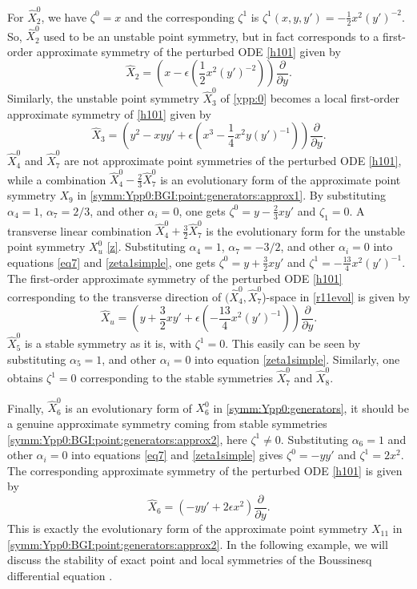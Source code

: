 \documentclass[11pt,letter,subeqn]{article}
\begin{document}
  For $\hat{X}^{0}_2$, we have $\zeta^0=x$ and the corresponding $\zeta^1$
  is $\zeta^1(x,y,y')=-\frac{1}{2}x^2(y')^{-2}$. So, $\hat{X}^{0}_2$ used to be an {\textrm{unstable}} point symmetry, but in fact corresponds to a first-order approximate symmetry of the
  perturbed ODE \eqref{h101} given by
  \[
    \hat{X}_2=\left(x-\epsilon\left(\dfrac{1}{2}x^2(y')^{-2}\right)\right)\dfrac{\partial}{\partial y}.
      \]
      Similarly, the {\textrm{unstable}} point symmetry $\hat{X}^{0}_3$ of \eqref{ypp:0} becomes a local first-order approximate symmetry of \eqref{h101} given by
     \[
    \hat{X}_3=\left(y^2-xyy'+\epsilon\left(x^3-\dfrac{1}{4}x^2y(y')^{-1}\right)\right)\dfrac{\partial}{\partial y}.
      \]
   $\hat{X}^{0}_4$ and $\hat{X}^{0}_7$ are not approximate point symmetries of the perturbed ODE \eqref{h101}, while a combination $\hat{X}^{0}_4-\frac{2}{3}\hat{X}^{0}_7$ is an
   {\textrm{evolutionary form}} of the approximate point symmetry $X_9$ in \eqref{symm:Ypp0:BGI:point:generators:approx1}. By
   substituting $\alpha_4=1$, $\alpha_7=2/3$, and other $\alpha_i=0$, one gets $\zeta^0=y-\frac{2}{3} xy'$ and $\zeta_1=0$. A transverse linear combination
   $\hat{X}^{0}_4+\frac{3}{2}\hat{X}^{0}_7$ is the {\textrm{evolutionary form}} for the {\textrm{unstable}} point symmetry $X^0_u$ \eqref{z}. Substituting $\alpha_4=1$,
   $\alpha_7=-3/2$, and other $\alpha_i=0$ into equations \eqref{eq7} and \eqref{zeta1simple}, one gets $\zeta^0=y+\frac{3}{2} xy'$ and $\zeta^1=-\frac{13}{4}x^2(y')^{-1}$. The
   first-order approximate symmetry of the perturbed ODE \eqref{h101} corresponding to the transverse direction of $(\hat{X}^{0}_4,\hat{X}^{0}_7$)-space in \eqref{r11evol} is given by
   \[
     \hat{X}_u=\left(y+\dfrac{3}{2} xy'+\epsilon\left(-\dfrac{13}{4}x^2(y')^{-1}\right)\right)\dfrac{\partial}{\partial y}.
   \]
   $\hat{X}^{0}_5$ is a {\textrm{stable}} symmetry as it is, with $\zeta^1=0$. This easily can be seen by substituting $\alpha_5=1$, and other $\alpha_i=0$ into equation \eqref{zeta1simple}. Similarly, one obtains  $\zeta^1=0$
   corresponding to the {\textrm{stable}} symmetries $\hat{X}^{0}_7$ and $\hat{X}^{0}_8$.

   Finally, $\hat{X}^{0}_6$ is an {\textrm{evolutionary form}} of $X^0_6$ in \eqref{symm:Ypp0:generators}, it should be a
   genuine approximate symmetry coming from {\textrm{stable}} symmetries \eqref{symm:Ypp0:BGI:point:generators:approx2}, here $\zeta^1\neq 0$. Substituting $\alpha_6=1$ and other $\alpha_i=0$ into
   equations \eqref{eq7} and \eqref{zeta1simple} gives $\zeta^0=-yy'$ and $\zeta^1=2x^2$. The corresponding approximate symmetry of the perturbed ODE \eqref{h101} is given by
   \[
    \hat{X}_6=\left(-yy'+2\epsilon x^2\right)\dfrac{\partial}{\partial y}.
      \]
      This is exactly the {\textrm{evolutionary form}} of the approximate point symmetry $X_{11}$ in \eqref{symm:Ypp0:BGI:point:generators:approx2}.
In the following example, we will discuss the stability of exact point and local
symmetries of the Boussinesq differential equation \cite{jafari2009new,manoranjan1988soliton}.
\end{document}
